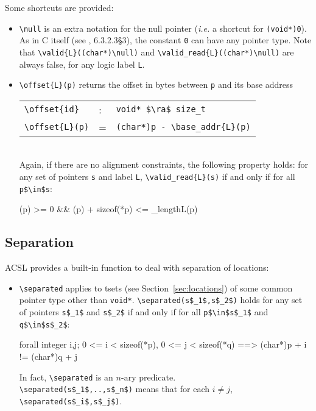 Some shortcuts are provided:
\begin{itemize}
\item \lstinline|\null| is an
  extra notation for the
  null pointer (\emph{i.e.} a shortcut for \lstinline|(void*)0|). 
  As in C itself (see \cite{standardc99}, 6.3.2.3\S3),
  the constant \lstinline|0| can have any pointer type. Note that 
  \lstinline|\valid{L}((char*)\null)| and \lstinline|\valid_read{L}((char*)\null)|
  are always false, for any
  logic label \lstinline|L|.
\item \lstinline|\offset{L}(p)|%
  returns the offset in bytes between \lstinline|p| and its base address
\\ \makebox[5mm]{} \begin{tabular}{lll}
    \lstinline|\offset{id}| &:& \lstinline|void* $\ra$ size_t| \\
    \lstinline|\offset{L}(p)| &=& \lstinline|(char*)p - \base_addr{L}(p)| \\
  \end{tabular} \\
Again, if there are no alignment constraints,
  the following property holds: for any set of pointers
\lstinline|s| and label \lstinline|L|, \lstinline|\valid_read{L}(s)| if and only if for all \lstinline|p$\in$s|:
  \begin{listing-nonumber}
    (p) >= 0 && (p) + sizeof(*p) <= \block_length{L}(p)
  \end{listing-nonumber}

\end{itemize}

\subsection{Separation}\label{sec:separated} 

ACSL provides a built-in function to deal with separation of locations:

\begin{itemize}
\item \lstinline|\separated|
applies to tsets (see Section~\ref{sec:locations}) of some common pointer type
other than \lstinline|void*|. 
\lstinline|\separated(s$_1$,s$_2$)|
holds for any set of pointers \lstinline|s$_1$| and \lstinline|s$_2$| 
if and only if for all \lstinline|p$\in$s$_1$| and \lstinline|q$\in$s$_2$|:
\begin{listing-nonumber}
  forall integer i,j; 0 <= i < sizeof(*p), 0 <= j < sizeof(*q)
     ==>  (char*)p + i != (char*)q + j 
\end{listing-nonumber}

In fact, \lstinline|\separated| is an $n$-ary predicate.\\
\lstinline|\separated(s$_1$,..,s$_n$)| means
that for each
$i\neq j$, \lstinline|\separated(s$_i$,s$_j$)|.
\end{itemize}

